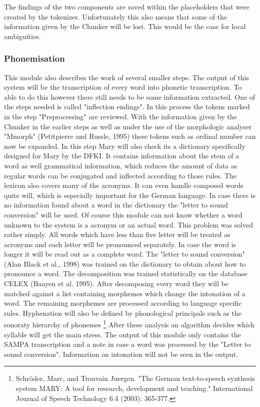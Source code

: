 \documentclass[a4paper, 12pt]{article}
\begin{document}
The findings of the two components are saved within the placeholders that were created by the tokenizer.
Unfortunately this also means that some of the information given by the Chunker will be lost. This would be the case for local ambiguities.


\subsubsection* {Phonemisation}

This module also describes the work of several smaller steps.
The output of this system will be the transcription of every word into phonetic transcription.
To able to do this however there still needs to be some information extracted.
One of the steps needed is called "inflection endings". 
In this process the tokens marked in the step "Preprocessing" are reviewed.
With the information given by the Chunker in the earlier steps as well as under the use of the morphologic analyser "Mmorph" (Petitpierre and Russle, 1995) these tokens such as ordinal number can now be expanded.\newline 
In this step Mary will also check its a dictionary specifically designed for Mary by the DFKI.
It contains information about the stem of a word as well grammatical information, which reduces the amount of data as regular words can be conjugated and inflected according to those rules.
The lexicon also covers many of the acronyms. 
It can even handle composed words quite will, which is especially important for the German language. \newline 
In case there is no information found about a word in the dictionary the "letter to sound conversion" will be used.
Of course this module can not know whether a word unknown to the system is a acronym or an actual word. 
This problem was solved rather simply. 
All words which have less than five letter will be treated as acronyms and each letter will be pronounced separately. 
In case the word is longer it will be read out as a complete word.
The "letter to sound conversion" (Alan Black et al., 1998) was trained on the dictionary to obtain about how to pronounce a word.
The decomposition was trained statistically on the database CELEX (Baayen et al. 1995).
After decomposing every word they will be matched against a list containing morphemes which change the intonation of a word.
The remaining morphemes are processed according to language specific rules.
Hyphenation will also be defined by phonological principals such as the sonoraty hierarchy of phonemes \footnote {Schröder, Marc, and Trouvain Juergen. "The German text-to-speech synthesis system MARY: A tool for research, development and teaching." International Journal of Speech Technology 6.4 (2003): 365-377.} \newline
After these analysis an algorithm decides which syllable will get the main stress.\newline
The output of this module only contains the SAMPA transcription and a note in case a word was processed by the "Letter to sound conversion". 
Information on intonation will not be seen in the output.
\end{document}
